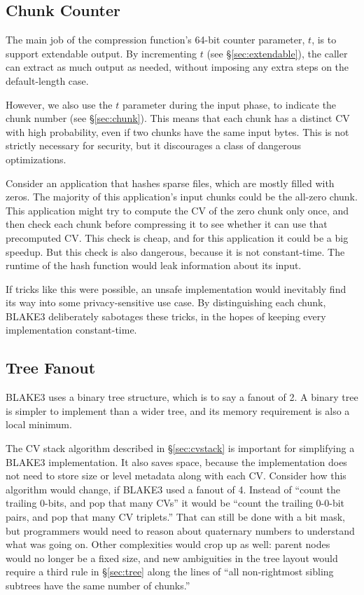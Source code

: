 \documentclass[11pt,notitlepage,a4paper]{article}
\begin{document}
\subsection{Chunk Counter}\label{sec:chunkcounter}

The main job of the compression function's 64-bit counter parameter, $t$, is to
support extendable output. By incrementing $t$ (see \S\ref{sec:extendable}),
the caller can extract as much output as needed, without imposing any extra
steps on the default-length case.

However, we also use the $t$ parameter during the input phase, to indicate the
chunk number (see \S\ref{sec:chunk}). This means that each chunk has a distinct
CV with high probability, even if two chunks have the same input bytes. This is
not strictly necessary for security, but it discourages a class of dangerous
optimizations.

Consider an application that hashes sparse files, which are mostly filled with
zeros. The majority of this application's input chunks could be the all-zero
chunk. This application might try to compute the CV of the zero chunk only
once, and then check each chunk before compressing it to see whether it can use
that precomputed CV. This check is cheap, and for this application it could be
a big speedup. But this check is also dangerous, because it is not
constant-time. The runtime of the hash function would leak information about
its input.

If tricks like this were possible, an unsafe implementation would inevitably
find its way into some privacy-sensitive use case. By distinguishing each
chunk, BLAKE3 deliberately sabotages these tricks, in the hopes of keeping
every implementation constant-time.

\subsection{Tree Fanout}\label{sec:treefanout}

BLAKE3 uses a binary tree structure, which is to say a fanout of 2. A binary
tree is simpler to implement than a wider tree, and its memory requirement is
also a local minimum.

The CV stack algorithm described in \S\ref{sec:cvstack} is important for
simplifying a BLAKE3 implementation. It also saves space, because the
implementation does not need to store size or level metadata along with each
CV. Consider how this algorithm would change, if BLAKE3 used a fanout of 4.
Instead of ``count the trailing 0-bits, and pop that many CVs'' it would be
``count the trailing 0-0-bit pairs, and pop that many CV triplets.'' That can
still be done with a bit mask, but programmers would need to reason about
quaternary numbers to understand what was going on. Other complexities would
crop up as well: parent nodes would no longer be a fixed size, and new
ambiguities in the tree layout would require a third rule in \S\ref{sec:tree}
along the lines of ``all non-rightmost sibling subtrees have the same number of
chunks.''
\end{document}
